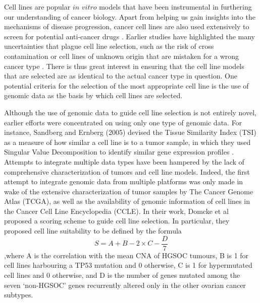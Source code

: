 \documentclass[a4paper,12pt]{article}
\begin{document}
Cell lines are popular $\textit{in vitro}$ models that have been
instrumental in furthering our understanding of cancer biology. Apart
from helping us gain insights into the mechanisms of disease
progression, cancer cell lines are also used extensively to screen for
potential anti-cancer drugs \cite{Yamori2003}. Earlier studies have
highlighted the many uncertainties that plague cell line selection,
such as the risk of cross contamination \cite{Gillet2013} or
cell lines of unknown origin that are mistaken for a wrong cancer type
\cite{Domcke2013}.  There is thus great interest in ensuring that
the cell line models that are selected are as identical to the actual
cancer type in question.  One potential criteria for the selection of
the most appropriate cell line is the use of genomic data as the
basis by which cell lines are selected.

Although the use of genomic data to guide cell line selection
is not entirely novel, earlier efforts were concentrated on using only one type of
genomic data. For instance, Sandberg and Ernberg (2005) devised the
Tissue Similarity Index (TSI) as a measure of how similar a cell line is to
a tumor sample, in which they used Singular Value Decomposition to
identify similar gene expression profiles
\cite{sandberg2005}.  Attempts to integrate
multiple data types have been hampered by the lack of comprehensive
characterization of tumors and cell line models. Indeed, the first
attempt to integrate genomic data from multiple platforms was only
made in wake of the extensive characterization of tumor samples by
The Cancer Genome Atlas (TCGA), as well as the availability of genomic
information of cell lines in the Cancer Cell Line Encyclopedia (CCLE). In their work, Domcke et al proposed a scoring scheme to guide cell line selection. In
particular, they proposed cell line suitability to be defined by the
formula\begin{equation} S = A + B - 2 \times C - \frac{D}{7}\end{equation},where A is
the correlation with the mean CNA of HGSOC tumours, B is 1 for cell
lines harbouring a TP53 mutation and 0 otherwise, C is 1 for
hypermutated cell lines and 0 otherwise, and D is the number of genes
mutated among the seven ‘non-HGSOC’ genes recurrently altered only in
the other ovarian cancer subtypes.
\end{document}
